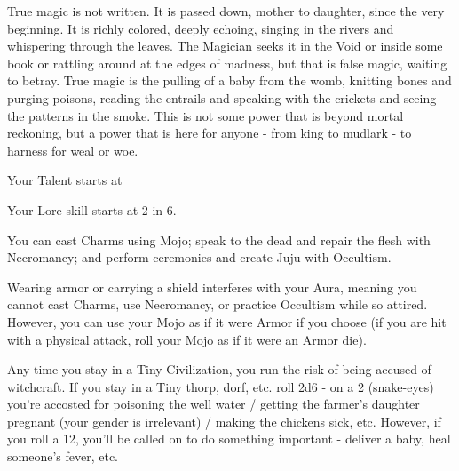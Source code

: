 {  

  True magic is not written. It is passed down, mother to daughter, since the very beginning.  It is richly colored, deeply echoing, singing in the rivers and whispering through the leaves.  The Magician seeks it in the Void or inside some book or rattling around at the edges of madness, but that is false magic, waiting to betray.  True magic is the pulling of a baby from the womb, knitting bones and purging poisons, reading the entrails and speaking with the crickets and seeing the patterns in the smoke.  This is not some power that is beyond mortal reckoning, but a power that is here for anyone - from king to mudlark - to harness for weal or woe.


  Your Talent starts at \DCUP

  Your Lore skill starts at 2-in-6. 

  \footnotemark
  You can cast Charms using Mojo; speak to the dead and repair the flesh with Necromancy; and perform ceremonies and create Juju with Occultism.  

  \footnotemark[\value{footnote}]
  Wearing armor or carrying a shield interferes with your Aura, meaning you cannot cast Charms, use Necromancy, or practice Occultism while so attired.  However, you can use your Mojo as if it were Armor if you choose (if you are hit with a physical attack, roll your Mojo \UD as if it were an Armor die).


  Any time you stay in a Tiny Civilization, you run the risk of being accused of witchcraft.  If you stay in a Tiny thorp, dorf, etc. roll 2d6 - on a 2 (snake-eyes) you're accosted for poisoning the well water / getting the farmer's daughter pregnant (your gender is irrelevant) / making the chickens sick, etc.  However, if you roll a 12, you'll be called on to do something important - deliver a baby, heal someone's fever, etc.

}
